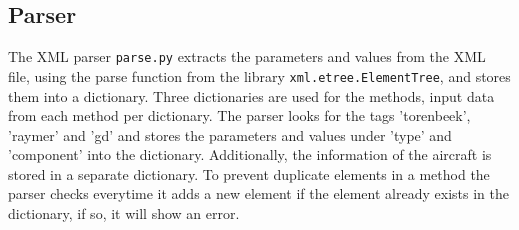 \subsection{Parser}
\label{subsec:parser}
The XML parser \texttt{parse.py} extracts the parameters and values from the XML file, using the parse function from the library \texttt{xml.etree.ElementTree}, and stores them into a dictionary.
Three dictionaries are used for the methods, input data from each method per dictionary.
The parser looks for the tags 'torenbeek', 'raymer' and 'gd' and stores the parameters and values under 'type' and 'component' into the dictionary.
Additionally, the information of the aircraft is stored in a separate dictionary.
To prevent duplicate elements in a method the parser checks everytime it adds a new element if the element already exists in the dictionary, if so, it will show an error.
